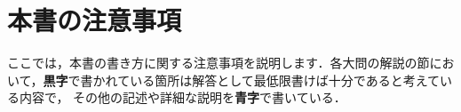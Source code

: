 \documentclass[../../../doc/main]{subfiles}
\begin{document}
    \setcounter{chapter}{0}
    \setcounter{section}{1}
    \section{本書の注意事項}\label{本書の注意事項}
        ここでは，本書の書き方に関する注意事項を説明します．各大問の解説の節において，{\bf 黒字}で書かれている箇所は解答として最低限書けば十分であると考えている内容で，
        その他の記述や詳細な説明を{\bf \textcolor{myBlue2}{青字}}で書いている．
\end{document}
